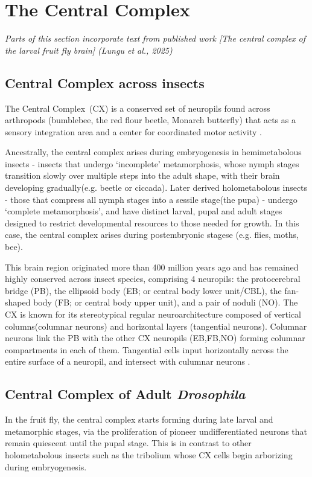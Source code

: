 \section{The Central Complex}
\label{CXAdultIntro}
\textit{Parts of this section incorporate text from published work [The central complex of the larval fruit fly brain] (Lungu et al., 2025)}

    \subsection{Central Complex across insects}
    
        The Central Complex~(CX) is a conserved set of neuropils found across arthropods (bumblebee, the red flour beetle, Monarch butterfly) that acts as a sensory integration area and a center for coordinated motor activity \citep{PfeifferHomberg2014, turnerevans2016CX, heinze2024variations}.

        Ancestrally, the central complex arises during embryogenesis in hemimetabolous insects - insects that undergo ‘incomplete’ metamorphosis, whose nymph stages transition slowly over multiple steps into the adult shape, with their brain developing gradually(e.g. beetle or ciccada).
        Later derived holometabolous insects - those that compress all nymph stages into a sessile stage(the pupa) -  undergo ‘complete metamorphosis’, and have distinct larval, pupal and adult stages designed to restrict developmental resources to those needed for growth. In this case, the central complex arises during  postembryonic stagese (e.g. flies, moths, bee).

        This brain region originated more than 400 million years ago and has remained highly conserved across insect species, comprising 4 neuropils: the protocerebral bridge (PB), the ellipsoid body (EB; or central body lower unit/CBL), the fan-shaped body (FB; or central body upper unit), and a pair of noduli (NO). The CX is known for its stereotypical regular neuroarchitecture composed of vertical columns(columnar neurons) and horizontal layers (tangential neurons). Columnar neurons link the PB with the other CX neuropils (EB,FB,NO) forming columnar compartments in each of them. Tangential cells input horizontally across the entire surface of a neuropil, and intersect with culumnar neurons \citep{honkanen2019insect}. 


    \subsection{Central Complex of Adult \textit{Drosophila}}
        In the fruit fly, the central complex starts forming during late larval and metamorphic stages, via the proliferation of pioneer undifferentiated neurons that remain quiescent until the pupal stage. This is in contrast to other holometabolous insects such as the tribolium \citep{farnworth2022atlas} whose CX cells begin arborizing during embryogenesis.


